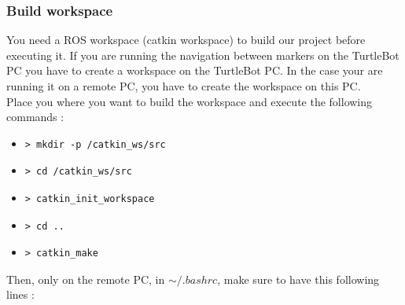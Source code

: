 \documentclass[10pt,a4paper]{article}
\begin{document}
\subsubsection{Build workspace}

You need a ROS workspace (catkin workspace) to build our project before executing it. If you are running the navigation between markers on the TurtleBot PC you have to create a workspace on the TurtleBot PC. In the case your are running it on a remote PC, you have to create the workspace on this PC.\\

Place you where you want to build the workspace and execute the following commands :

\begin{itemize}
\item[]  \begin{verbatim}> mkdir -p /catkin_ws/src \end{verbatim}
\item[]  \begin{verbatim}> cd /catkin_ws/src \end{verbatim}
\item[]  \begin{verbatim}> catkin_init_workspace \end{verbatim}
\item[]  \begin{verbatim}> cd .. \end{verbatim}
\item[]  \begin{verbatim}> catkin_make \end{verbatim}
\end{itemize}

\newpage

Then, only on the remote PC, in $\sim/.bashrc$, make sure to have this following lines :
\end{document}
